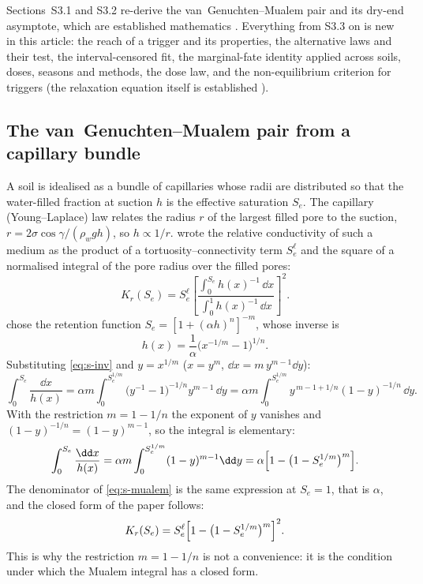 Sections~S3.1 and S3.2 re-derive the van~Genuchten--Mualem pair and its dry-end asymptote, which are established mathematics \citep{vanGenuchten1980,Mualem1976}. Everything from S3.3 on is new in this article: the reach of a trigger and its properties, the alternative laws and their test, the interval-censored fit, the marginal-fate identity applied across soils, doses, seasons and methods, the dose law, and the non-equilibrium criterion for triggers (the relaxation equation itself is established \citep{RossSmettem2000}).

\subsection{The van~Genuchten--Mualem pair from a capillary bundle}
A soil is idealised as a bundle of capillaries whose radii are distributed so that the water-filled fraction at suction $h$ is the effective saturation $S_e$. The capillary (Young--Laplace) law relates the radius $r$ of the largest filled pore to the suction, $r=2\sigma\cos\gamma/(\rho_w g h)$, so $h\propto1/r$. \citet{Mualem1976} wrote the relative conductivity of such a medium as the product of a tortuosity--connectivity term $S_e^{\ell}$ and the square of a normalised integral of the pore radius over the filled pores:
\begin{equation}
K_r(S_e)=S_e^{\ell}\left[\frac{\int_0^{S_e}h(x)^{-1}\,\dd x}{\int_0^{1}h(x)^{-1}\,\dd x}\right]^{2}. \label{eq:s-mualem}
\end{equation}
\citet{vanGenuchten1980} chose the retention function $S_e=[1+(\alpha h)^n]^{-m}$, whose inverse is
\begin{equation}
h(x)=\frac{1}{\alpha}\bigl(x^{-1/m}-1\bigr)^{1/n}. \label{eq:s-inv}
\end{equation}
Substituting \cref{eq:s-inv} and $y=x^{1/m}$ ($x=y^{m}$, $\dd x=m\,y^{m-1}\dd y$):
\begin{equation}
\int_0^{S_e}\frac{\dd x}{h(x)}=\alpha m\int_0^{S_e^{1/m}}\bigl(y^{-1}-1\bigr)^{-1/n}y^{m-1}\,\dd y=\alpha m\int_0^{S_e^{1/m}}y^{\,m-1+1/n}(1-y)^{-1/n}\,\dd y .
\end{equation}
With the restriction $m=1-1/n$ the exponent of $y$ vanishes and $(1-y)^{-1/n}=(1-y)^{m-1}$, so the integral is elementary:
\begin{equation}
\int_0^{S_e}\frac{\dd x}{h(x)}=\alpha m\int_0^{S_e^{1/m}}(1-y)^{m-1}\dd y=\alpha\Bigl[1-\bigl(1-S_e^{1/m}\bigr)^{m}\Bigr].
\end{equation}
The denominator of \cref{eq:s-mualem} is the same expression at $S_e=1$, that is $\alpha$, and the closed form of the paper follows:
\begin{equation}
K_r(S_e)=S_e^{\ell}\Bigl[1-\bigl(1-S_e^{1/m}\bigr)^{m}\Bigr]^{2}. \label{eq:s-kr}
\end{equation}
This is why the restriction $m=1-1/n$ is not a convenience: it is the condition under which the Mualem integral has a closed form.


